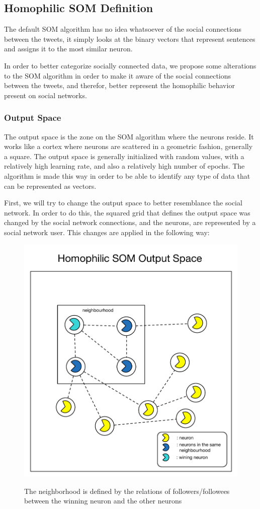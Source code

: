 \documentclass[journal]{IEEEtran}
\begin{document}
\subsection{Homophilic SOM Definition}
\label{sec:algorithm_changes}
The default \ac{SOM} algorithm has no idea whatsoever of the social connections between the tweets, it simply looks at the binary vectors that represent sentences and assigns it to the most similar neuron.

In order to better categorize socially connected data, we propose some alterations to the \ac{SOM} algorithm in order to make it aware of the social connections between the tweets, and therefor, better represent the homophilic behavior present on social networks.

\subsubsection{Output Space}
\label{sub:output_space}
The output space is the zone on the \ac{SOM} algorithm where the neurons reside. It works like a cortex where neurons are scattered in a geometric fashion, generally a square. The output space is generally initialized with random values, with a relatively high learning rate, and also a relatively high number of epochs. The algorithm is made this way in order to be able to identify any type of data that can be represented as vectors.

First, we will try to change the output space to better resemblance the social network. In order to do this, the squared grid that defines the output space was changed by the social network connections, and the neurons, are represented by a social network user. This changes are applied in the following way:

\begin{figure}[h]
  \centering
  \includegraphics[width=0.6\linewidth]{./images/homophilic_outputspace.pdf}
  \label{chp3:homout}
  \caption{ The neighborhood is defined by the relations of followers/followees between the winning neuron and the other neurons }
\end{figure}
\end{document}
